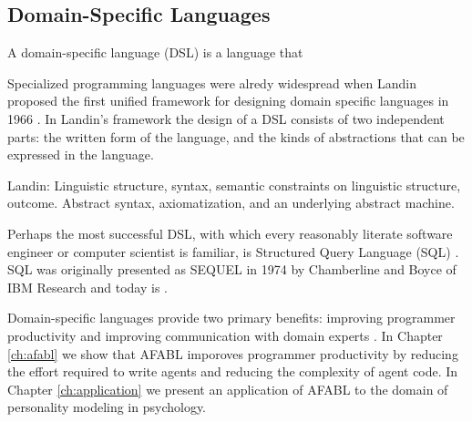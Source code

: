 \cite{polancic2010a-an-empirical}


\subsection{Domain-Specific Languages}

A domain-specific language (DSL) is a language that

Specialized programming languages were alredy widespread when Landin proposed the first unified framework for designing domain specific languages in 1966 \cite{landin1966next}. In Landin's framework the design of a DSL consists of two independent parts: the written form of the language, and the kinds of abstractions that can be expressed in the language.

Landin: Linguistic structure, syntax, semantic constraints on linguistic structure, outcome. Abstract syntax, axiomatization, and an underlying abstract machine.

Perhaps the most successful DSL, with which every reasonably literate software engineer or computer scientist is familiar, is Structured Query Language (SQL) \cite{}. SQL was originally presented as SEQUEL in 1974 by Chamberline and Boyce of IBM Research \cite{chamberlin1974sequel} and today is .

Domain-specific languages provide two primary benefits: improving programmer productivity and improving communication with domain experts \cite{fowler2011domain}. In Chapter \ref{ch:afabl} we show that AFABL imporoves programmer productivity by reducing the effort required to write agents and reducing the complexity of agent code. In Chapter \ref{ch:application} we present an application of AFABL to the domain of personality modeling in psychology.

\cite{hudak1996building}
\cite{hudak1998modular}


\cite{lorenz2011a-code}


\cite{taha2008domain-specific}


\cite{deursen2000domain-specific}


\cite{dmitriev2004a-language}



\cite{spinellis2001notable}


\cite{mitchell1993on-abstraction}


\cite{odersky2008programming}


\cite{simpkins2008towards}


\cite{zang2007towards}


